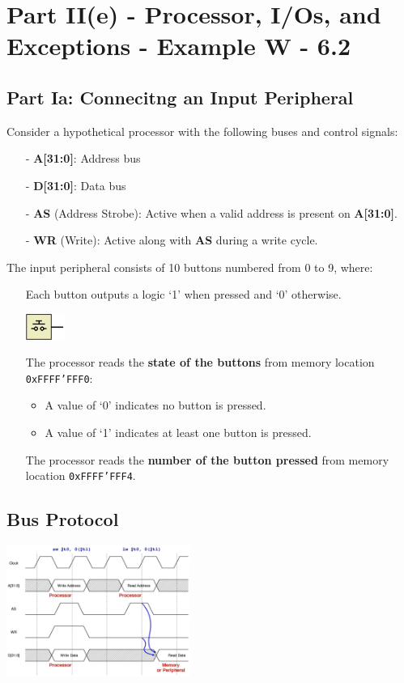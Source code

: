 \chapter{Part II(e) - Processor, I/Os, and Exceptions - Example W - 6.2}
\section{Part Ia: Connecitng an Input Peripheral}
Consider a hypothetical processor with the following buses and control signals:
\begin{itemize}
    \item[-] \textbf{A[31:0]}: Address bus
    \item[-] \textbf{D[31:0]}: Data bus
    \item[-] \textbf{AS} (Address Strobe): Active when a valid address is present on \textbf{A[31:0]}.
    \item[-] \textbf{WR} (Write): Active along with \textbf{AS} during a write cycle.
\end{itemize}

The input peripheral consists of 10 buttons numbered from 0 to 9, where:
\begin{itemize}
    \item[] Each button outputs a logic ‘1’ when pressed and ‘0’ otherwise.
    \begin{center}
        \includegraphics[width=0.10\textwidth]{chapters/chapter2e/images/button.png}
    \end{center}
    \item[] The processor reads the \textbf{state of the buttons} from memory location \texttt{0xFFFF'FFF0}:
    \begin{itemize}
        \item A value of ‘0’ indicates no button is pressed.
        \item A value of ‘1’ indicates at least one button is pressed.
    \end{itemize}
    \item[] The processor reads the \textbf{number of the button pressed} from memory location \texttt{0xFFFF'FFF4}.
\end{itemize}

\section{Bus Protocol}
 \begin{center}
     \includegraphics[width=0.45\textwidth]{chapters/chapter2e/images/bus.png}
 \end{center}
